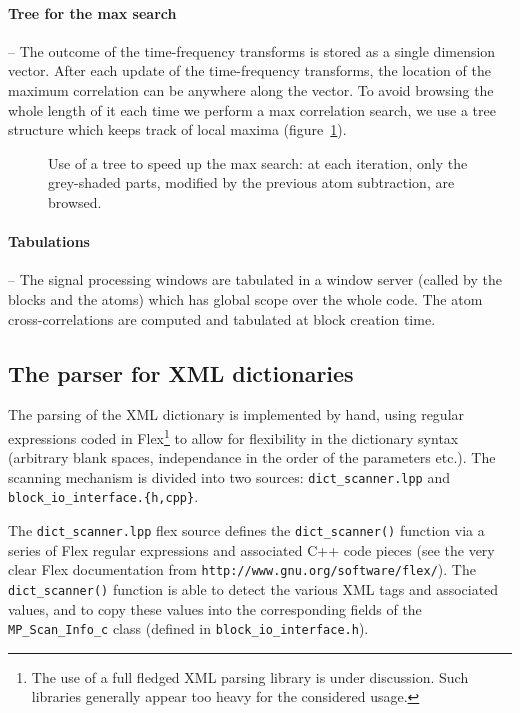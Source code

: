 \documentclass[11pt,a4paper]{article}
\begin{document}
\paragraph{Tree for the max search} -- The outcome of the time-frequency
transforms is stored as a single dimension vector. After each update of the
time-frequency transforms, the location of the maximum correlation can be
anywhere along the vector. To avoid browsing the whole length of it each time
we perform a max correlation search, we use a tree structure which keeps track
of local maxima (figure~\ref{tree}).
%
\begin{figure}[hbp]
\centerline{}
\caption{\label{tree} Use of a tree to speed up the max search: at each
  iteration, only the grey-shaded parts, modified by the previous atom
  subtraction, are browsed.}
\end{figure}

\paragraph{Tabulations} -- The signal processing windows are tabulated
in a window server (called by the blocks and the atoms) which has global scope
over the whole code. The atom cross-correlations are computed and tabulated at
block creation time.


\subsection{The parser for XML dictionaries \label{dict_scanner}}
The parsing of the XML dictionary is implemented by hand, using regular
expressions coded in Flex\footnote{The use of a full fledged XML parsing
  library is under discussion. Such libraries generally appear too heavy for
  the considered usage.} to allow for flexibility in the dictionary syntax
(arbitrary blank spaces, independance in the order of the parameters etc.). The
scanning mechanism is divided into two sources: \verb+dict_scanner.lpp+ and
\verb+block_io_interface.{h,cpp}+.

The \verb+dict_scanner.lpp+ flex source defines the \verb+dict_scanner()+
function via a series of Flex regular expressions and associated C++ code
pieces (see the very clear Flex documentation from
\verb+http://www.gnu.org/software/flex/+). The \verb+dict_scanner()+ function
is able to detect the various XML tags and associated values, and to copy these
values into the corresponding fields of the \verb+MP_Scan_Info_c+ class
(defined in \verb+block_io_interface.h+).
\end{document}
